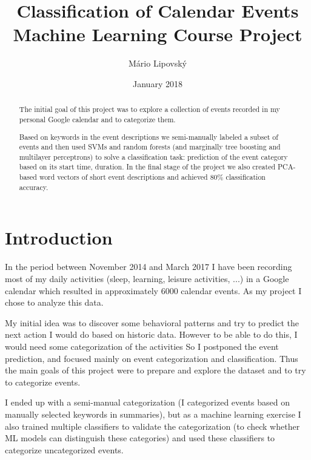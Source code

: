 \documentclass[a4paper, 12pt]{article}
\title{Classification of Calendar Events \\ 
\normalsize{Machine Learning Course Project}}
\date{January 2018}
\author{Mário Lipovský}
\begin{document}
\maketitle

\begin{abstract}
The initial goal of this project was to explore a collection of events 
recorded in my personal Google calendar and to categorize them. 

Based on keywords in the event descriptions we semi-manually labeled a 
subset of events and then used SVMs and random forests (and marginally 
tree boosting and multilayer perceptrons) to solve a classification task:
prediction of the event category based on its start time, duration.
In the final stage of the project we also created PCA-based word vectors 
of short event descriptions and achieved 80\% classification accuracy.

\end{abstract}

\section{Introduction}
In the period between November 2014 and March 2017 I have been recording most of
my daily activities (sleep, learning, leisure activities, ...) in a Google calendar
which resulted in approximately 6000 calendar events. As my project I chose to 
analyze this data.

My initial idea was to discover some behavioral patterns and try to predict the
next action I would do based on historic data. However to be able to do this,
I would need some categorization of the activities
So I postponed the event prediction, and focused mainly on
event categorization and classification. Thus the main goals of this project
were to prepare and explore the dataset and to try to categorize events. 

I ended up with a semi-manual categorization (I categorized events based
on manually selected keywords in summaries), but as a machine learning 
exercise I also trained multiple classifiers to validate the categorization
(to check whether ML models can distinguish these categories) and used these
classifiers to categorize uncategorized events.
\end{document}
